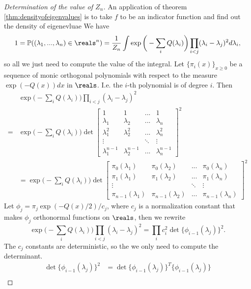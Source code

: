 \begin{proof}[Determination of the value of $Z_n$]

An application of theorem \ref{thm:densityofeigenvalues} is to take $f$ to be an indicator function and find out the density of eigenevluae 
We have \[
1 = \mathbb{P}((\lambda_1,...,\lambda_n) \in \reals^n) = \frac{1}{Z_n}\int \exp\bigg(- \sum_{i} Q(\lambda_i)\bigg)\prod_{i<j}(\lambda_i -\lambda_j)^2 d\lambda_i,
\]
so all we just need to compute the value of the integral.
Let $\{\pi_i(x)\}_{x\geq 0}$ be a sequence of monic orthogonal polynomials with respect to the measure $\exp ( -Q(x)) dx$ in $\reals$. I.e. the $i$-th polynomial is of degree $i$. Then \begin{align*}
    &\exp\bigg(- \sum_{i} Q(\lambda_i)\bigg)\prod_{i<j}(\lambda_i -\lambda_j)^2 \\
    =&\exp\bigg(- \sum_{i} Q(\lambda_i)\bigg)\det
    \begin{bmatrix}
        1 & 1 & ... & 1 \\
        \lambda_1 & \lambda_2 & ... & \lambda_n \\ 
        \lambda_1^2& \lambda_2^2 & ... & \lambda_n^2\\
        \vdots & &\ddots&\vdots\\
        \lambda_1^{n-1}&\lambda_2^{n-1}&...&\lambda_n^{n-1}
    \end{bmatrix}^2\\
    &=\exp\bigg(- \sum_{i} Q(\lambda_i)\bigg)
    \det \begin{bmatrix}
        \pi_0(\lambda_1) & \pi_0(\lambda_2) & ... & \pi_0(\lambda_n) \\
       \pi_1(\lambda_1) & \pi_1(\lambda_2)& ... & \pi_1(\lambda_n) \\
        \vdots & &\ddots&\vdots\\
        \pi_{n-1}(\lambda_1)&\pi_{n-1}(\lambda_2)&...&\pi_{n-1}(\lambda_n)
    \end{bmatrix}^2
\end{align*}
Let $\phi_j = \pi_j \exp (-Q(x)/2) /c_j$, where $c_j$ is a normalization constant that makes $\phi_j$ orthonormal functions on $\reals$, then we rewrite\[
\exp\bigg(- \sum_{i} Q(\lambda_i)\bigg)\prod_{i<j}(\lambda_i -\lambda_j)^2 = \prod_{i}c_i^2 \det \{\phi_{i-1}(\lambda_j)\}^2.
\]
The $c_j$ constants are deterministic, so the we only need to compute the determinant.
\begin{align*}
    \det \{\phi_{i-1}(\lambda_j)\}^2 &= \det \{\phi_{i-1}(\lambda_j)\}^T \{\phi_{i-1}(\lambda_j)\}\\

\end{align*}
\end{proof}
